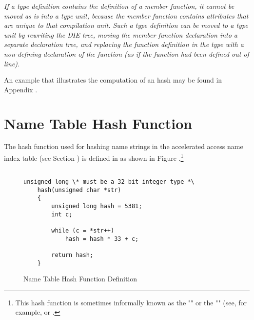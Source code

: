 \textit{If a type definition contains the definition of a member function, 
it cannot be moved as is into a type unit, because the member function 
contains attributes that are unique to that compilation unit. 
Such a type definition can be moved to a type unit by rewriting the DIE tree, 
moving the member function declaration into a separate declaration tree, 
and replacing the function definition in the type with a non-defining 
declaration of the function (as if the function had been defined out of 
line).}

An example that illustrates the computation of an \MDfive{} hash may be found in 
Appendix .

\section{Name Table Hash Function}
\label{datarep:nametablehashfunction}
The hash function used for hashing name strings in the accelerated 
access name index table (see Section )
is defined in  as shown in 
Figure .\footnote{
This hash function is sometimes informally known as the 
"" or the ""
(see, for example, 
 or
.} 

\begin{figure}[here]
\begin{lstlisting}

unsigned long \* must be a 32-bit integer type *\
    hash(unsigned char *str)
    {
        unsigned long hash = 5381;
        int c;

        while (c = *str++)
            hash = hash * 33 + c;

        return hash;
    }

\end{lstlisting}
\caption{Name Table Hash Function Definition}
\label{fig:nametablehashfunctiondefinition}
\end{figure}

